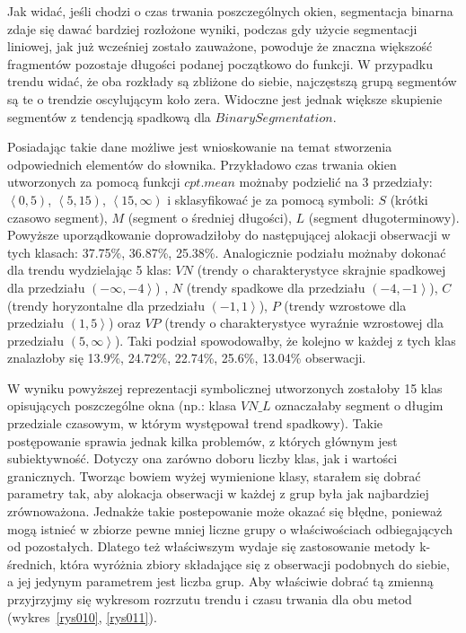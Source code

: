 \documentclass[polish, twoside, 12pt, a4paper]{article}
\theoremstyle{definition}
\theoremstyle{plain}
\theoremstyle{remark}
\begin{document}
Jak widać, jeśli chodzi o czas trwania poszczególnych okien, segmentacja binarna zdaje się dawać bardziej rozłożone wyniki, podczas gdy użycie segmentacji liniowej, jak już wcześniej 
zostało zauważone, powoduje że znaczna większość fragmentów pozostaje długości podanej początkowo do funkcji. W przypadku trendu widać, że oba rozkłady są zbliżone do siebie, najczęstszą 
grupą segmentów są te o trendzie oscylującym koło zera. Widoczne jest jednak większe skupienie segmentów z tendencją spadkową dla \(Binary Segmentation\).

Posiadając takie dane możliwe jest wnioskowanie na temat stworzenia odpowiednich elementów do słownika. Przykładowo czas trwania okien utworzonych za pomocą funkcji \(cpt.mean\) możnaby 
podzielić na 3 przedziały: $\left<0, 5 \right)$, $\left<5, 15 \right)$, $\left<15, \infty \right)$ i sklasyfikować je za pomocą symboli: \(S\) (krótki czasowo segment), \(M\) (segment o średniej długości), \(L\) (segment długoterminowy). Powyższe 
uporządkowanie doprowadziłoby do następującej alokacji obserwacji w tych klasach: 37.75\%, 36.87\%, 25.38\%. Analogicznie podziału możnaby dokonać dla trendu wydzielając 5 klas: \(VN\) (trendy o charakterystyce skrajnie 
spadkowej dla przedziału $\left(-\infty, -4\right>$)  , \(N\) (trendy spadkowe dla przedziału  $\left(-4, -1\right>$), \(C\) (trendy horyzontalne dla przedziału  $\left(-1, 1\right>$), \(P\) (trendy wzrostowe dla przedziału  
$\left(1, 5\right>$) oraz \(VP\) (trendy o charakterystyce wyraźnie wzrostowej dla przedziału  $\left(5, \infty \right>$). Taki podział spowodowałby, że kolejno w każdej z tych klas znalazłoby się 13.9\%, 24.72\%, 
22.74\%, 25.6\%, 13.04\% obserwacji.

W wyniku powyższej reprezentacji symbolicznej utworzonych zostałoby 15 klas opisujących poszczególne okna  (np.: klasa \(VN\_L\) oznaczałaby segment o długim przedziale czasowym, w którym 
występował trend spadkowy). Takie postępowanie sprawia jednak kilka problemów, z których głównym jest subiektywność. Dotyczy ona zarówno doboru liczby klas, jak i wartości 
granicznych. Tworząc bowiem wyżej wymienione klasy, starałem się dobrać parametry tak, aby alokacja obserwacji w każdej z grup była jak najbardziej zrównoważona. Jednakże takie postepowanie może okazać się 
błędne, ponieważ mogą istnieć w zbiorze pewne mniej liczne grupy o właściwościach odbiegających od pozostałych. Dlatego też właściwszym wydaje się zastosowanie metody k-średnich, która wyróżnia zbiory 
składające się z obserwacji podobnych do siebie, a jej jedynym parametrem jest liczba grup. Aby właściwie dobrać tą zmienną przyjrzyjmy się wykresom rozrzutu trendu i czasu trwania dla obu metod (wykres~\ref{rys010}, 
\ref{rys011}).
\end{document}
